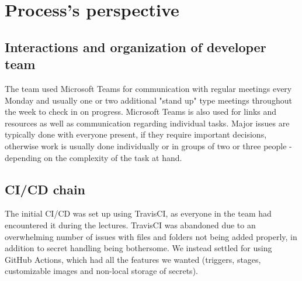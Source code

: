 \section{Process's perspective} \label{section:Process perspective}

\subsection{Interactions and organization of developer team} 
The team used Microsoft Teams for communication with regular meetings every Monday and usually one or two additional "stand up" type meetings throughout the week to check in on progress. Microsoft Teams is also used for links and resources as well as communication regarding individual tasks. Major issues are typically done with everyone present, if they require important decisions, otherwise work is usually done individually or in groups of two or three people - depending on the complexity of the task at hand.

\subsection{CI/CD chain} 
The initial CI/CD was set up using TravisCI, as everyone in the team had encountered it during the lectures. TravisCI was abandoned due to an overwhelming number of issues with files and folders not being added properly, in addition to secret handling being bothersome. We instead settled for using GitHub Actions, which had all the features we wanted (triggers, stages, customizable images and non-local storage of secrets).

